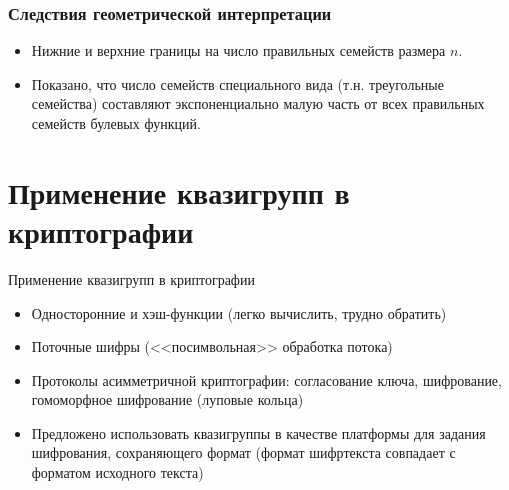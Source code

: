 \begin{frame}
    \frametitle{Следствия геометрической интерпретации}
    \begin{itemize}
        \item Нижние и верхние границы на число правильных семейств размера $n.$
        \item Показано, что число семейств специального вида (т.н. треугольные семейства) составляют экспоненциально малую часть от всех правильных семейств булевых функций.
    \end{itemize}
\end{frame}


\section{Применение квазигрупп в криптографии}
\begin{frame}
    \begin{center}
        \Huge
        Применение квазигрупп в криптографии
    \end{center}
\end{frame}


\begin{frame}
    \begin{itemize}
        \item Односторонние и хэш-функции (легко вычислить, трудно обратить)
        \item Поточные шифры (<<посимвольная>> обработка потока)
        \item Протоколы асимметричной криптографии: согласование ключа, шифрование, гомоморфное шифрование (луповые кольца)
        \item Предложено использовать квазигруппы в качестве платформы для задания шифрования, сохраняющего формат (формат шифртекста совпадает с форматом исходного текста)
    \end{itemize}
\end{frame}
